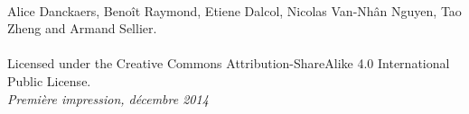 ~\vfill
\thispagestyle{empty}

\noindent {} Alice Danckaers, Benoît Raymond, Etiene Dalcol, Nicolas Van-Nhân Nguyen, Tao Zheng and Armand Sellier.\\\\ %



\noindent Licensed under the Creative Commons Attribution-ShareAlike 4.0 International Public License.\\ %

\noindent \textit{Première impression, décembre 2014} %